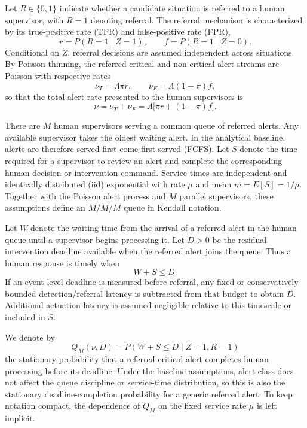 \documentclass[letterpaper,10pt,conference]{ieeeconf}
\begin{document}
Let \(R\in\{0,1\}\) indicate whether a candidate situation is referred to a
human supervisor, with \(R=1\) denoting referral. The referral mechanism is
characterized by its true-positive rate (TPR) and false-positive rate (FPR),
\begin{equation}
r = P(R=1 \mid Z=1),
\qquad
f = P(R=1 \mid Z=0).
\end{equation}
Conditional on \(Z\), referral decisions are assumed independent across
situations. By Poisson thinning, the referred critical and non-critical alert
streams are Poisson with respective rates
\begin{equation}
\nu_T = \Lambda \pi r,
\qquad
\nu_F = \Lambda (1-\pi)f,
\end{equation}
so that the total alert rate presented to the human supervisors is
\begin{equation}
\nu
=
\nu_T+\nu_F
=
\Lambda\bigl[\pi r+(1-\pi)f\bigr].
\label{eq:alert-rate}
\end{equation}

There are \(M\) human supervisors serving a common queue of referred alerts.
Any available supervisor takes the oldest waiting alert. In the analytical
baseline, alerts are therefore served first-come first-served (FCFS).
Let \(S\) denote the time required for a supervisor to review an alert and
complete the corresponding human decision or intervention command. Service
times are independent and identically distributed (iid) exponential with rate
\(\mu\) and mean \(m=E[S]=1/\mu\). Together with the Poisson alert process
and \(M\) parallel supervisors, these assumptions define an \(M/M/M\) queue
in Kendall notation.

Let \(W\) denote the waiting time from the arrival of a referred alert in the
human queue until a supervisor begins processing it. Let \(D>0\) be the residual intervention deadline available when the referred alert
joins the queue. Thus a human response is timely when
\begin{equation}
W+S\leq D.
\end{equation}
If an event-level deadline is measured before referral, any fixed or
conservatively bounded detection/referral latency is subtracted from that
budget to obtain \(D\). Additional actuation latency is assumed negligible
relative to this timescale or included in \(S\).

We denote by
\begin{equation}
Q_M(\nu,D)
=
P(W+S\leq D \mid Z=1,R=1)
\end{equation}
the stationary probability that a referred critical alert completes human
processing before its deadline. Under the baseline assumptions, alert class
does not affect the queue discipline or service-time distribution, so this is
also the stationary deadline-completion probability for a generic referred
alert. To keep notation compact, the dependence of \(Q_M\) on the fixed
service rate \(\mu\) is left implicit.
\end{document}
